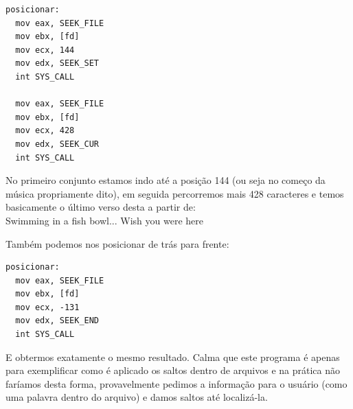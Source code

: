 \begin{lstlisting}[]
posicionar:
  mov eax, SEEK_FILE
  mov ebx, [fd]
  mov ecx, 144
  mov edx, SEEK_SET
  int SYS_CALL

  mov eax, SEEK_FILE
  mov ebx, [fd]
  mov ecx, 428
  mov edx, SEEK_CUR
  int SYS_CALL
\end{lstlisting}

No primeiro conjunto estamos indo até a posição 144 (ou seja no começo da música propriamente dito), em seguida percorremos mais 428 caracteres e temos basicamente o último verso desta a partir de: \\
{\ttfamily Swimming in a fish bowl... Wish you were here}

Também podemos nos posicionar de trás para frente:
\begin{lstlisting}[]
posicionar:
  mov eax, SEEK_FILE
  mov ebx, [fd]
  mov ecx, -131
  mov edx, SEEK_END
  int SYS_CALL
\end{lstlisting}

E obtermos exatamente o mesmo resultado. Calma que este programa é apenas para exemplificar como é aplicado os saltos dentro de arquivos e na prática não faríamos desta forma, provavelmente pedimos a informação para o usuário (como uma palavra dentro do arquivo) e damos saltos até localizá-la.

\clearpage